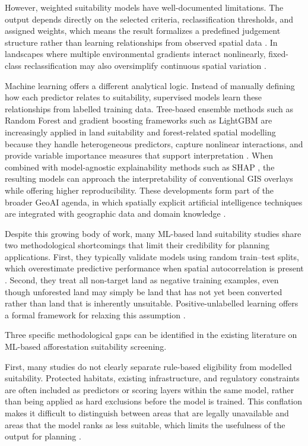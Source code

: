 \documentclass[land,article,submit,moreauthors]{Definitions/mdpi}
\begin{document}
However, weighted suitability models have well-documented limitations. The output depends directly on the selected criteria, reclassification thresholds, and assigned weights, which means the result formalizes a predefined judgement structure rather than learning relationships from observed spatial data \citep{taghizadeh2020}. In landscapes where multiple environmental gradients interact nonlinearly, fixed-class reclassification may also oversimplify continuous spatial variation \citep{taghizadeh2020}.

Machine learning offers a different analytical logic. Instead of manually defining how each predictor relates to suitability, supervised models learn these relationships from labelled training data. Tree-based ensemble methods such as Random Forest \citep{breiman2001} and gradient boosting frameworks such as LightGBM \citep{ke2017lightgbm} are increasingly applied in land suitability and forest-related spatial modelling because they handle heterogeneous predictors, capture nonlinear interactions, and provide variable importance measures that support interpretation \citep{southworth2024,buthelezi2024review}. When combined with model-agnostic explainability methods such as SHAP \citep{lundberg2017shap}, the resulting models can approach the interpretability of conventional GIS overlays while offering higher reproducibility. These developments form part of the broader GeoAI agenda, in which spatially explicit artificial intelligence techniques are integrated with geographic data and domain knowledge \citep{janowicz2020}.

Despite this growing body of work, many ML-based land suitability studies share two methodological shortcomings that limit their credibility for planning applications. First, they typically validate models using random train--test splits, which overestimate predictive performance when spatial autocorrelation is present \citep{meyer2022,roberts2017}. Second, they treat all non-target land as negative training examples, even though unforested land may simply be land that has not yet been converted rather than land that is inherently unsuitable. Positive-unlabelled learning offers a formal framework for relaxing this assumption \citep{elkan2008,bekker2020}.


Three specific methodological gaps can be identified in the existing literature on ML-based afforestation suitability screening.

First, many studies do not clearly separate rule-based eligibility from modelled suitability. Protected habitats, existing infrastructure, and regulatory constraints are often included as predictors or scoring layers within the same model, rather than being applied as hard exclusions before the model is trained. This conflation makes it difficult to distinguish between areas that are legally unavailable and areas that the model ranks as less suitable, which limits the usefulness of the output for planning \citep{buthelezi2024review,taghizadeh2020}.
\end{document}

